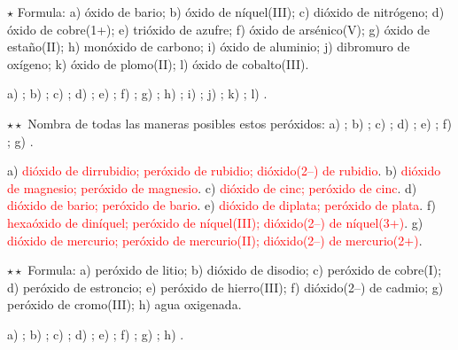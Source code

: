 \begin{exercise}
    \(\star\) Formula: a) óxido de bario; b) óxido de níquel(III); c) dióxido de nitrógeno; d) óxido de cobre(1+); e) trióxido de
    azufre; f) óxido de arsénico(V); g) óxido de estaño(II); h) monóxido de carbono; i) óxido de aluminio; j) dibromuro de
    oxígeno; k) óxido de plomo(II); l) óxido de cobalto(III).
    \begin{solu}
        a) \textcolor{red}{}; b) \textcolor{red}{}; c) \textcolor{red}{}; d) \textcolor{red}{};
        e) \textcolor{red}{}; f) \textcolor{red}{}; g) \textcolor{red}{}; h) \textcolor{red}{};
        i) \textcolor{red}{}; j) \textcolor{red}{}; k) \textcolor{red}{}; l) \textcolor{red}{}.
    \end{solu}
\end{exercise}

\begin{exercise}
    \(\star\star\) Nombra de todas las maneras posibles estos peróxidos: a) ; b) ; c) ; d) ;
    e) ; f) ; g) .
    \begin{solu}
        a) \textcolor{red}{dióxido de dirrubidio; peróxido de rubidio; dióxido(2\nobreakdash--) de rubidio}. b) \textcolor{red}{dióxido de
        magnesio; peróxido de magnesio}. c) \textcolor{red}{dióxido de cinc; peróxido de cinc}. d) \textcolor{red}{dióxido de bario;
        peróxido de bario}. e) \textcolor{red}{dióxido de diplata; peróxido de plata}. f) \textcolor{red}{hexaóxido de diníquel;
        peróxido de níquel(III); dióxido(2\nobreakdash--) de níquel(3+)}. g) \textcolor{red}{dióxido de mercurio; peróxido de mercurio(II);
        dióxido(2\nobreakdash--) de mercurio(2+)}.
    \end{solu}
\end{exercise}

\begin{exercise}
    \(\star\star\) Formula: a) peróxido de litio; b) dióxido de disodio; c) peróxido de cobre(I); d) peróxido de estroncio; e)
    peróxido de hierro(III); f) dióxido(2\nobreakdash--) de cadmio; g) peróxido de cromo(III); h) agua oxigenada.
    \begin{solu}
        a) \textcolor{red}{}; b) \textcolor{red}{}; c) \textcolor{red}{}; d) \textcolor{red}{};
        e) \textcolor{red}{}; f) \textcolor{red}{}; g) \textcolor{red}{}; h) \textcolor{red}{}.
    \end{solu}
\end{exercise}

